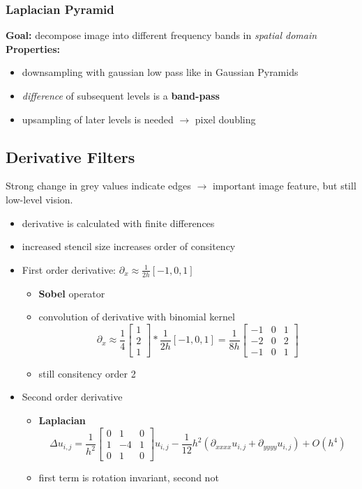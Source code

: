\documentclass[11pt]{article}
\begin{document}
\subsubsection{Laplacian Pyramid}
\label{sec-2-2-2}
\textbf{Goal:} decompose image into different frequency bands in \emph{spatial domain} \\
    \textbf{Properties:}
\begin{itemize}
\item downsampling with gaussian low pass like in Gaussian Pyramids
\item \emph{difference} of subsequent levels is a \textbf{band-pass}
\item upsampling of later levels is needed $\rightarrow$ pixel doubling
\end{itemize}
\subsection{Derivative Filters}
\label{sec-2-3}
Strong change in grey values indicate edges $\rightarrow$ important image feature, but still
low-level vision.
\begin{itemize}
\item derivative is calculated with finite differences
\item increased stencil size increases order of consitency
\item First order derivative: $\partial_x \approx \frac{1}{2h} [-1,0,1]$
\begin{itemize}
\item \textbf{Sobel} operator
\item convolution of derivative with binomial kernel
       \[ \partial_x \approx \frac{1}{4} \begin{bmatrix} 1 \\ 2 \\ 
       1 \end{bmatrix} * \frac{1}{2h}[-1,0,1] = 
       \frac{1}{8h} \begin{bmatrix} -1 & 0 & 1 \\ -2 & 0 & 2 \\ -1 & 0 & 1 \end{bmatrix} \]
\item still consitency order 2
\end{itemize}
\item Second order derivative
\begin{itemize}
\item \textbf{Laplacian}
       \[ \Delta u_{i,j} = \frac{1}{h^2} \begin{bmatrix} 
          0&1&0 \\ 1&-4&1 \\ 0&1&0 \end{bmatrix} u_{i,j} -  
	  \frac{1}{12}h^2(\partial_{xxxx}u_{i,j}+\partial_{yyyy}u_{i,j}) + O(h^4) \]
\item first term is rotation invariant, second not
\end{itemize}
\end{itemize}
\end{document}
